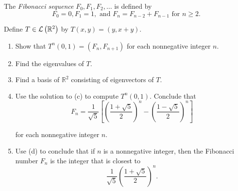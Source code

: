 \begin{exercise}
    The \textit{Fibonacci sequence} $F_{0}, F_{1}, F_{2}, \ldots$ is defined by
    \[
        F_{0} = 0, F_{1} = 1, \text{ and } F_{n} = F_{n-2} + F_{n-1} \text{ for $n\geq 2$}.
    \]

    Define $T\in\mathcal{L}\left({\mathbb{R}^{2}}\right)$ by $T(x, y) = (y, x + y)$.

    \begin{enumerate}[label={(\alph*)}]
        \item Show that $T^{n}(0, 1) = (F_{n}, F_{n+1})$ for each nonnegative integer $n$.
        \item Find the eigenvalues of $T$.
        \item Find a basis of $\mathbb{R}^{2}$ consisting of eigenvectors of $T$.
        \item Use the solution to (c) to compute $T^{n}(0, 1)$. Conclude that
              \[
                  F_{n} = \frac{1}{\sqrt{5}}\left[{\left(\frac{1 + \sqrt{5}}{2}\right)}^{n} - {\left(\frac{1 - \sqrt{5}}{2}\right)}^{n}\right]
              \]

              for each nonnegative integer $n$.
        \item Use (d) to conclude that if $n$ is a nonnegative integer, then the Fibonacci number $F_{n}$ is the integer that is closest to
              \[
                  \frac{1}{\sqrt{5}}{\left(\frac{1 + \sqrt{5}}{2}\right)}^{n}.
              \]
    \end{enumerate}
\end{exercise}

